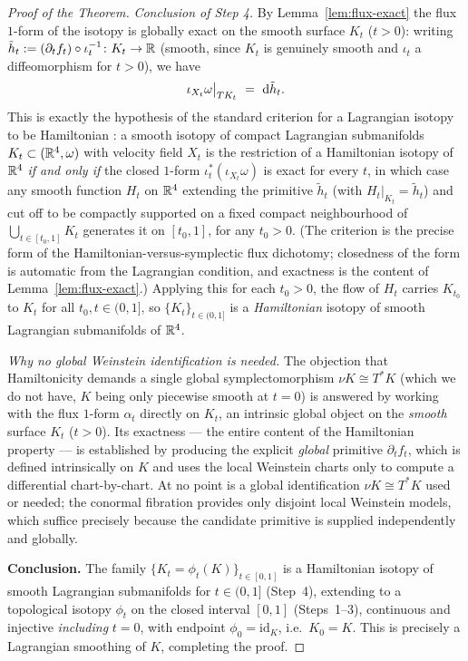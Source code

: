 \begin{proof}[Proof of the Theorem]
\noindent\emph{Conclusion of Step 4.}
By Lemma~\ref{lem:flux-exact} the flux $1$-form of the isotopy is globally exact on
the smooth surface $K_t$ ($t>0$): writing $\tilde h_t:=(\partial_t f_t)\circ\iota_t^{-1}
\colon K_t\to\mathbb{R}$ (smooth, since $K_t$ is genuinely smooth and $\iota_t$ a
diffeomorphism for $t>0$), we have
\[
\iota_{X_t}\omega\big|_{TK_t}\ =\ \qeightdd\tilde h_t .
\]
This is exactly the hypothesis of the standard criterion for a Lagrangian isotopy to
be Hamiltonian \cite[Prop.~9.1.2 and \S9.1]{McDuffSalamon}: a smooth isotopy of
compact Lagrangian submanifolds $K_t\subset(\mathbb{R}^4,\omega)$ with velocity field
$X_t$ is the restriction of a Hamiltonian isotopy of $\mathbb{R}^4$ \emph{if and only if}
the closed $1$-form $\iota_t^{*}(\iota_{X_t}\omega)$ is exact for every $t$, in which
case any smooth function $H_t$ on $\mathbb{R}^4$ extending the primitive $\tilde h_t$ (with
$H_t|_{K_t}=\tilde h_t$) and cut off to be compactly supported on a fixed compact
neighbourhood of $\bigcup_{t\in[t_0,1]}K_t$ generates it on $[t_0,1]$, for any
$t_0>0$. (The criterion is the precise form of the Hamiltonian-versus-symplectic
flux dichotomy; closedness of the form is automatic from the Lagrangian condition,
and exactness is the content of Lemma~\ref{lem:flux-exact}.) Applying this for each
$t_0>0$, the flow of $H_t$ carries $K_{t_0}$ to $K_t$ for all $t_0,t\in(0,1]$, so
$\{K_t\}_{t\in(0,1]}$ is a \emph{Hamiltonian} isotopy of smooth Lagrangian
submanifolds of $\mathbb{R}^4$.

\medskip
\noindent\emph{Why no global Weinstein identification is needed.} The objection that
Hamiltonicity demands a single global symplectomorphism $\nu K\cong T^*K$ (which we do
not have, $K$ being only piecewise smooth at $t=0$) is answered by working with the
flux $1$-form $\alpha_t$ directly on $K_t$, an intrinsic global object on the
\emph{smooth} surface $K_t$ ($t>0$). Its exactness — the entire content of the
Hamiltonian property — is established by producing the explicit \emph{global}
primitive $\partial_t f_t$, which is defined intrinsically on $K$ and uses the local
Weinstein charts only to compute a differential chart-by-chart. At no point is a
global identification $\nu K\cong T^*K$ used or needed; the conormal fibration
provides only disjoint local Weinstein models, which suffice precisely because the
candidate primitive is supplied independently and globally.

\medskip

\noindent\textbf{Conclusion.} The family $\{K_t=\phi_t(K)\}_{t\in[0,1]}$ is a
Hamiltonian isotopy of smooth Lagrangian submanifolds for $t\in(0,1]$ (Step~4),
extending to a topological isotopy $\phi_t$ on the closed interval $[0,1]$
(Steps~1–3), continuous and injective \emph{including} $t=0$, with endpoint
$\phi_0=\mathrm{id}_K$, i.e.\ $K_0=K$. This is precisely a Lagrangian smoothing of
$K$, completing the proof.
\end{proof}

